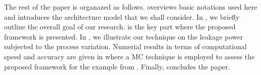 The rest of the paper is organazed as follows.  overviews basic notations used here and introduces the architecture model that we shall consider. In , we briefly outline the overall goal of our research.  is the key part where the proposed framework is presented. In , we illustrate our technique on the leakage power subjected to the process variation. Numerial results in terms of computational speed and accuracy are given in  where a MC technique is employed to assess the proposed framework for the example from . Finally,  concludes the paper.
